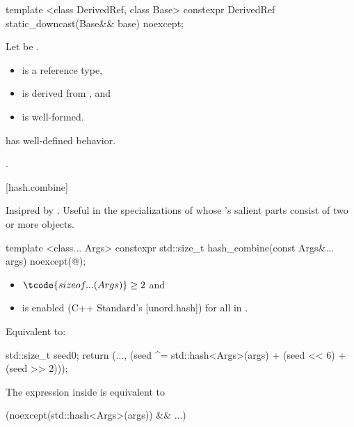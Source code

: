 %
\begin{itemdecl}
template <class DerivedRef, class Base>
constexpr DerivedRef static_downcast(Base&& base) noexcept;
\end{itemdecl}

\begin{itemdescr}
\pnum
Let  be
.

\pnum
\constraints
\begin{itemize}
\item
   is a reference type,
\item
   is derived from
  , and
\item
   is well-formed.
\end{itemize}

\pnum
\expects
{} has well-defined behavior.

\pnum
\returns
{}.
\end{itemdescr}

[hash.combine]{}

\pnum
Insipred by .
Useful in the specializations of 
whose 's salient parts consist of two or more objects.

%
\begin{itemdecl}
template <class... Args>
constexpr std::size_t hash_combine(const Args&... args) noexcept(@\seebelow@);
\end{itemdecl}

\begin{itemdescr}
\pnum
\constraints
\begin{itemize}
\item
  $\tcode{sizeof...(Args)} \geq 2$ and
\item
   is enabled (C++ Standard's [unord.hash])
  for all  in .
\end{itemize}

\pnum
\effects
Equivalent to:
\begin{codeblock}
std::size_t seed{0};
return (..., (seed ^= std::hash<Args>{}(args) + (seed << 6) + (seed >> 2)));
\end{codeblock}

\pnum
\remarks
The expression inside  is equivalent to
\begin{codeblock}
(noexcept(std::hash<Args>{}(args)) && ...)
\end{codeblock}
\end{itemdescr}
